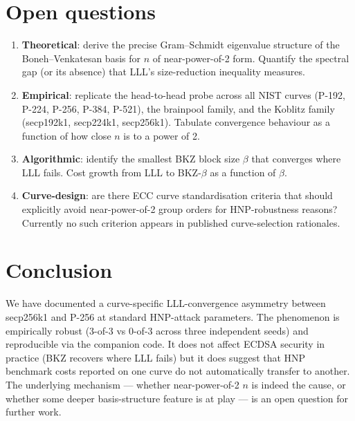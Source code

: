 \documentclass[10pt,a4paper]{article}
\begin{document}
\section{Open questions}

\begin{enumerate}
\item \textbf{Theoretical}: derive the precise Gram--Schmidt
      eigenvalue structure of the Boneh--Venkatesan basis for $n$
      of near-power-of-2 form. Quantify the spectral gap (or its
      absence) that LLL's size-reduction inequality measures.
\item \textbf{Empirical}: replicate the head-to-head probe across
      all NIST curves (P-192, P-224, P-256, P-384, P-521), the
      brainpool family, and the Koblitz family (secp192k1,
      secp224k1, secp256k1). Tabulate convergence behaviour as a
      function of how close $n$ is to a power of 2.
\item \textbf{Algorithmic}: identify the smallest BKZ block size
      $\beta$ that converges where LLL fails. Cost growth from
      LLL to BKZ-$\beta$ as a function of $\beta$.
\item \textbf{Curve-design}: are there ECC curve standardisation
      criteria that should explicitly avoid near-power-of-2 group
      orders for HNP-robustness reasons? Currently no such
      criterion appears in published curve-selection rationales.
\end{enumerate}

\section{Conclusion}

We have documented a curve-specific LLL-convergence asymmetry
between secp256k1 and P-256 at standard HNP-attack parameters.
The phenomenon is empirically robust (3-of-3 vs 0-of-3 across
three independent seeds) and reproducible via the companion code.
It does not affect ECDSA security in practice (BKZ recovers
where LLL fails) but it does suggest that HNP benchmark costs
reported on one curve do not automatically transfer to another.
The underlying mechanism --- whether near-power-of-2 $n$ is
indeed the cause, or whether some deeper basis-structure feature
is at play --- is an open question for further work.
\end{document}
